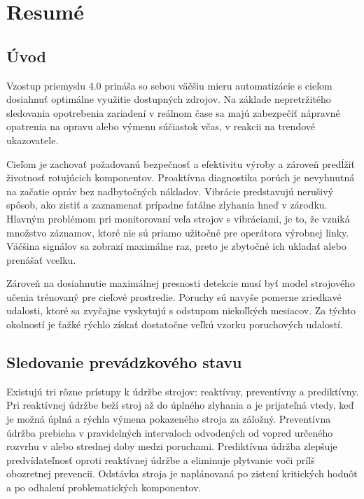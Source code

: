 \thispagestyle{empty}
\chapter{Resumé}
\renewcommand*{\thepage}{A-\arabic{page}}

\section{Úvod}
Vzostup priemyslu 4.0 prináša so sebou väčšiu mieru automatizácie s cieľom dosiahnuť optimálne využitie dostupných zdrojov. Na základe nepretržitého sledovania opotrebenia zariadení v reálnom čase sa majú zabezpečiť nápravné opatrenia na opravu alebo výmenu súčiastok včas, v reakcii na trendové ukazovatele. 

Cieľom je zachovať požadovanú bezpečnosť a efektivitu výroby a zároveň predĺžiť životnosť rotujúcich komponentov. Proaktívna diagnostika porúch je nevyhnutná na začatie opráv bez nadbytočných nákladov. Vibrácie predstavujú nerušivý spôsob, ako zistiť a zaznamenať prípadne fatálne zlyhania hneď v zárodku. Hlavným problémom pri monitorovaní veľa strojov s vibráciami, je to, že vzniká množstvo záznamov, ktoré nie sú priamo užitočné pre operátora výrobnej linky. Väčšina signálov sa zobrazí maximálne raz, preto je zbytočné ich ukladať alebo prenášať vcelku. 

Zároveň na dosiahnutie maximálnej presnosti detekcie musí byť model strojového učenia trénovaný pre cieľové prostredie. Poruchy sú navyše pomerne zriedkavé udalosti, ktoré sa zvyčajne vyskytujú s odstupom niekoľkých mesiacov. Za týchto okolností je ťažké rýchlo získať dostatočne veľkú vzorku poruchových udalostí.

\section{Sledovanie prevádzkového stavu}
Existujú tri rôzne prístupy k údržbe strojov: reaktívny, preventívny a prediktívny.
Pri reaktívnej údržbe beží stroj až do úplného zlyhania a je prijateľná vtedy, keď je možná úplná a rýchla výmena pokazeného stroja za záložný. Preventívna údržba prebieha v pravidelných intervaloch odvodených od vopred určeného rozvrhu v alebo strednej doby medzi poruchami. Prediktívna údržba zlepšuje predvídateľnosť oproti reaktívnej údržbe a eliminuje plytvanie voči prílš obozretnej prevencii. Odstávka stroja je naplánovaná po zistení kritických hodnôt a po odhalení problematických komponentov.

